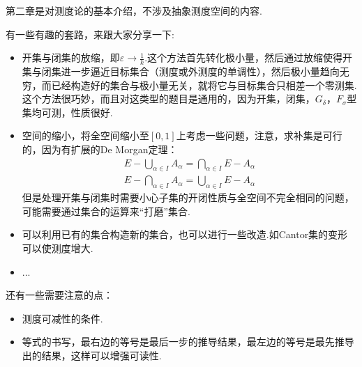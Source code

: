 \documentclass[bwprint, withoutpreface]{cumcmthesis}
\begin{document}
第二章是对测度论的基本介绍，不涉及抽象测度空间的内容.

有一些有趣的套路，来跟大家分享一下:
\begin{itemize}[itemindent=2em]
	\item 开集与闭集的放缩，即$\varepsilon \to \frac{1}{k}$.这个方法首先转化极小量，然后通过放缩使得开集与闭集进一步逼近目标集合（测度或外测度的单调性），然后极小量趋向无穷，而已经构造好的集合与极小量无关，就将它与目标集合只相差一个零测集.这个方法很巧妙，而且对这类型的题目是通用的，因为开集，闭集，$G_{\delta}$，$F_{\sigma}$型集均可测，性质很好.
	\item 空间的缩小，将全空间缩小至$[0, 1]$上考虑一些问题，注意，求补集是可行的，因为有扩展的De Morgan定理：
	\begin{align*}
		E - \bigcup_{\alpha \in I}{A_{\alpha}} = \bigcap_{\alpha \in I}{E - A_{\alpha}} \\
		E - \bigcap_{\alpha \in I}{A_{\alpha}} = \bigcup_{\alpha \in I}{E - A_{\alpha}}
	\end{align*}
	但是处理开集与闭集时需要小心子集的开闭性质与全空间不完全相同的问题，可能需要通过集合的运算来“打磨”集合.
	\item 可以利用已有的集合构造新的集合，也可以进行一些改造.如Cantor集的变形可以使测度增大.
	\item ...
\end{itemize}

还有一些需要注意的点：
\begin{itemize}[itemindent=2em]
	\item 测度可减性的条件.
	\item 等式的书写，最右边的等号是最后一步的推导结果，最左边的等号是最先推导出的结果，这样可以增强可读性.
\end{itemize}
\end{document}
